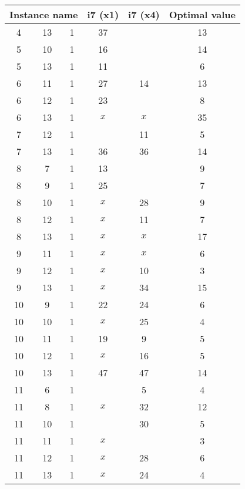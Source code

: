 \begin{table}[H]
\centering
	\begin{tabular}{cccccc}
		\multicolumn{3}{c}{Instance name}
					& i7 (x1)	& i7 (x4)	& Optimal value \\
		\midrule
		 4 & 13 & 1	& 37			& 			& 13 \\
		 5 & 10 & 1	& 16			& 			& 14 \\
		 5 & 13 & 1	& 11			& 			&  6 \\
		 6 & 11 & 1	& 27			& 14			& 13 \\
		 6 & 12 & 1	& 23			& 			&  8 \\
		 6 & 13 & 1	& $x$		& $x$		& 35 \\
		 7 & 12 & 1	& 			& 11			&  5 \\
		 7 & 13 & 1	& 36			& 36			& 14 \\
		 8 &  7 & 1	& 13			& 			&  9 \\
		 8 &  9 & 1	& 25			& 			&  7 \\
		 8 & 10 & 1	& $x$		& 28			&  9 \\
		 8 & 12 & 1	& $x$		& 11			&  7 \\
		 8 & 13 & 1	& $x$		& $x$		& 17 \\
		 9 & 11 & 1	& $x$		& $x$		&  6 \\
		 9 & 12 & 1	& $x$		& 10			&  3 \\
		 9 & 13 & 1	& $x$		& 34			& 15 \\
		10 &  9 & 1	& 22			& 24			&  6 \\
		10 & 10 & 1	& $x$		& 25			&  4 \\
		10 & 11 & 1	& 19			&  9			&  5 \\
		10 & 12 & 1	& $x$		& 16			&  5 \\
		10 & 13 & 1	& 47			& 47			& 14 \\
		11 &  6 & 1	& 			&  5			&  4 \\
		11 &  8 & 1	& $x$		& 32			& 12 \\
		11 & 10 & 1	&  			& 30			&  5 \\
		11 & 11 & 1	& $x$		& 			&  3 \\
		11 & 12 & 1	& $x$		& 28			&  6 \\
		11 & 13 & 1	& $x$		& 24			&  4 \\
	\end{tabular}
	\label{table:benchmark:LP-results:suboptimalinstances}
\end{table}


